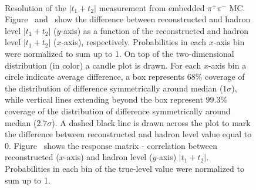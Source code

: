 \begin{figure}[h]
{}%
\quad\quad%
\parbox{0.4725\textwidth}{
  \centering
  \begin{subfigure}[b]{\linewidth}\addtocounter{subfigure}{-2}\vspace*{-12pt}
  \end{subfigure}\\
    \begin{minipage}[t][1.042\linewidth][t]{\linewidth}\vspace{10pt}
    \caption[Resolution of the $|t_{1}+t_{2}|$ measurement from embedded $\pi^{+}\pi^{-}$ MC.]{Resolution of the $|t_{1}+t_{2}|$ measurement from embedded $\pi^{+}\pi^{-}$ MC. Figure~ and~ show the difference between reconstructed and hadron level $|t_{1}+t_{2}|$ ($y$-axis) as a function of the reconstructed and hadron level $|t_{1}+t_{2}|$ ($x$-axis), respectively. Probabilities in each $x$-axis bin were normalized to sum up to 1. On top of the two-dimensional distribution (in color) a candle plot is drawn. For each $x$-axis bin a circle indicate average difference, a box represents 68\% coverage of the distribution of difference symmetrically around median ($1\sigma$), while vertical lines extending beyond the box represent 99.3\% coverage of the distribution of difference symmetrically around median ($2.7\sigma$). A dashed black line is drawn across the plot to mark the difference between reconstructed and hadron level value equal to 0. Figure~ shows the response matrix - correlation between reconstructed ($x$-axis) and hadron level ($y$-axis) $|t_{1}+t_{2}|$. Probabilities in each bin of the true-level value were normalized to sum up to 1.}\label{fig:Response_MandelstamTSum}%
  \end{minipage}
}%
\end{figure}




